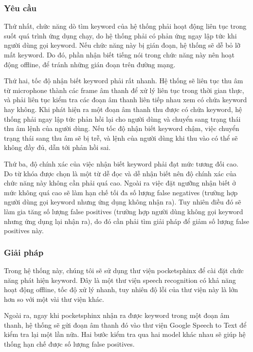 \subsubsection{Yêu cầu}

Thứ nhất, chức năng dò tìm keyword của hệ thống phải hoạt động liên tục trong suốt quá trình ứng dụng chạy, do hệ thống phải có phản ứng ngay lập tức khi người dùng gọi keyword. Nếu chức năng này bị gián đoạn, hệ thống sẽ dễ bỏ lỡ mất keyword. Do đó, phần nhận biết tiếng nói trong chức năng này nên hoạt động offline, để tránh những gián đoạn trên đường mạng.

Thứ hai, tốc độ nhận biết keyword phải rất nhanh. Hệ thống sẽ liên tục thu âm từ microphone thành các frame âm thanh để xử lý liên tục trong thời gian thực, và phải liên tục kiểm tra các đoạn âm thanh liên tiếp nhau xem có chứa keyword hay không. Khi phát hiện ra một đoạn âm thanh thu được có chứa keyword, hệ thống phải ngay lập tức phản hồi lại cho người dùng và chuyển sang trạng thái thu âm lệnh của người dùng. Nếu tốc độ nhận biết keyword chậm, việc chuyển trạng thái sang thu âm sẽ bị trễ, và lệnh của người dùng khi thu vào có thể sẽ không đầy đủ, dẫn tới phản hồi sai.

Thứ ba, độ chính xác của việc nhận biết keyword phải đạt mức tương đối cao. Do từ khóa được chọn là một từ dễ đọc và dễ nhận biết nên độ chính xác của chức năng này không cần phải quá cao. Ngoài ra việc đặt ngưỡng nhận biết ở mức không quá cao sẽ làm hạn chế tối đa số lượng false negatives (trường hợp người dùng gọi keyword nhưng ứng dụng không nhận ra). Tuy nhiên điều đó sẽ làm gia tăng số lượng false positives (trường hợp người dùng không gọi keyword nhưng ứng dụng lại nhận ra), do đó cần phải tìm giải pháp để giảm số lượng false positives này.

\subsubsection{Giải pháp}

Trong hệ thống này, chúng tôi sẽ sử dụng thư viện pocketsphinx để cài đặt chức năng phát hiện keyword. Đây là một thư viện speech recognition có khả năng hoạt động offline, tốc độ xử lý nhanh, tuy nhiên độ lỗi của thư viện này là lớn hơn so với một vài thư viện khác.

Ngoài ra, ngay khi pocketsphinx nhận ra được keyword trong một đoạn âm thanh, hệ thống sẽ gửi đoạn âm thanh đó vào thư viện Google Speech to Text để kiểm tra lại một lần nữa. Hai bước kiểm tra qua hai model khác nhau sẽ giúp hệ thống hạn chế được số lượng false positives.

